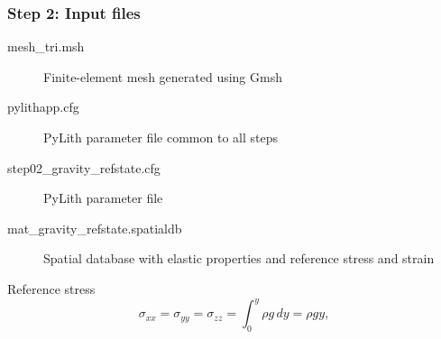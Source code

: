 \documentclass[aspectratio=169]{beamer}
\begin{document}
\begin{frame}[t,fragile]
  
\end{frame}


\begin{frame}
  \frametitle{Step 2: Input files}
  \summary{}

  \begin{description}
  \item[mesh\_tri.msh] Finite-element mesh generated using Gmsh
  \item[pylithapp.cfg] PyLith parameter file common to all steps
  \item[step02\_gravity\_refstate.cfg] PyLith parameter file
  \item[mat\_gravity\_refstate.spatialdb] Spatial database with elastic properties and reference stress and strain
  \end{description}

  \vfill
  Reference stress
  \begin{equation}
    \sigma_{xx} = \sigma_{yy} = \sigma_{zz} = \int_0^y \rho g \, dy = \rho g y,
  \end{equation}
  
\end{frame}
\end{document}
